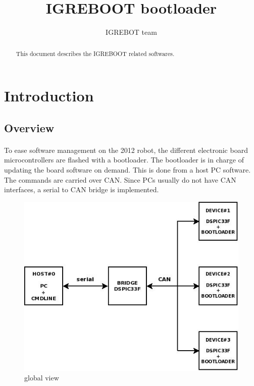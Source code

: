 \documentclass[a4paper, 11pt]{article}
\begin{document}
\title{IGREBOOT bootloader}
\author{IGREBOT team}
\date{}

\maketitle


\newpage
\tableofcontents
{}


\newpage
\begin{abstract}
This document describes the IGREBOOT related softwares.
\end{abstract}


\newpage
\section{Introduction}

\subsection{Overview}
\paragraph{}
To ease software management on the 2012 robot, the different electronic board
microcontrollers are flashed with a bootloader. The bootloader is in charge
of updating the board software on demand. This is done from a host PC software.
The commands are carried over CAN. Since PCs usually do not have CAN interfaces,
a serial to CAN bridge is implemented.

\begin{figure}[]
\centering
\includegraphics[scale=0.5]{./dia/global_view/main.jpeg}
\caption{global view}
\label{global_view}
\end{figure}
\end{document}

